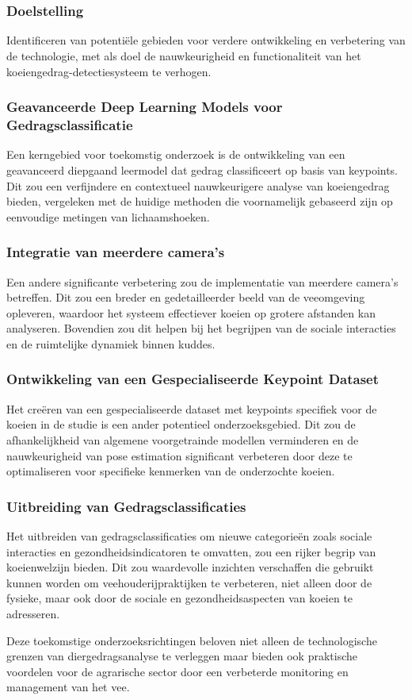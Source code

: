 \chapter{}
\label{ch:toekomst}
\subsection{Doelstelling}
Identificeren van potentiële gebieden voor verdere ontwikkeling en verbetering van de technologie, met als doel de nauwkeurigheid en functionaliteit van het koeiengedrag-detectiesysteem te verhogen.

\subsection{Geavanceerde Deep Learning Models voor Gedragsclassificatie}
Een kerngebied voor toekomstig onderzoek is de ontwikkeling van een geavanceerd diepgaand leermodel dat gedrag classificeert op basis van keypoints. Dit zou een verfijndere en contextueel nauwkeurigere analyse van koeiengedrag bieden, vergeleken met de huidige methoden die voornamelijk gebaseerd zijn op eenvoudige metingen van lichaamshoeken.

\subsection{Integratie van meerdere camera's}
Een andere significante verbetering zou de implementatie van meerdere camera's betreffen. Dit zou een breder en gedetailleerder beeld van de veeomgeving opleveren, waardoor het systeem effectiever koeien op grotere afstanden kan analyseren. Bovendien zou dit helpen bij het begrijpen van de sociale interacties en de ruimtelijke dynamiek binnen kuddes.

\subsection{Ontwikkeling van een Gespecialiseerde Keypoint Dataset}
Het creëren van een gespecialiseerde dataset met keypoints specifiek voor de koeien in de studie is een ander potentieel onderzoeksgebied. Dit zou de afhankelijkheid van algemene voorgetrainde modellen verminderen en de nauwkeurigheid van pose estimation significant verbeteren door deze te optimaliseren voor specifieke kenmerken van de onderzochte koeien.

\subsection{Uitbreiding van Gedragsclassificaties}
Het uitbreiden van gedragsclassificaties om nieuwe categorieën zoals sociale interacties en gezondheidsindicatoren te omvatten, zou een rijker begrip van koeienwelzijn bieden. Dit zou waardevolle inzichten verschaffen die gebruikt kunnen worden om veehouderijpraktijken te verbeteren, niet alleen door de fysieke, maar ook door de sociale en gezondheidsaspecten van koeien te adresseren.

Deze toekomstige onderzoeksrichtingen beloven niet alleen de technologische grenzen van diergedragsanalyse te verleggen maar bieden ook praktische voordelen voor de agrarische sector door een verbeterde monitoring en management van het vee.
